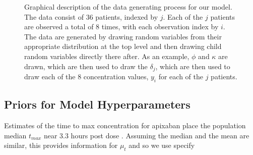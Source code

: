 \begin{figure}[h!]
	\centering
	
	
	\caption{Graphical description of the data generating process for our model.  The data consist of 36 patients, indexed by $j$.  Each of the $j$ patients are observed a total of 8 times, with each observation index by $i$.  The data are generated by drawing random variables from their appropriate distribution at the top level and then drawing child random variables directly there after.  As an example, $\phi$ and $\kappa$ are drawn, which are then used to draw the $\delta_j$, which are then used to draw each of the 8 concentration values, $y_i$ for each of the $j$ patients.}
	\label{net}
\end{figure}

\subsection*{Priors for Model Hyperparameters}

Estimates of the time to max concentration for apixaban place the population median $t_{\mathit{max}}$ near 3.3 hours post dose  \citep{Byon2019-gf}. Assuming the median and the mean are similar, this provides information for $\mu_t$ and so we use specify 

